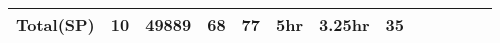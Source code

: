\begin{table}
\begin{CodeOut}
\begin{center}
\begin {tabular} {|l|c|c|c|c|c|c|c|c|c|c|c|c|}
Total(SP)&    10      &49889		&68		&77			&5hr			&3.25hr	&35\\
\hline

\end{tabular}
\end{center}
\end{CodeOut}
\vspace{- 0.35 in}
\end{table}
%
